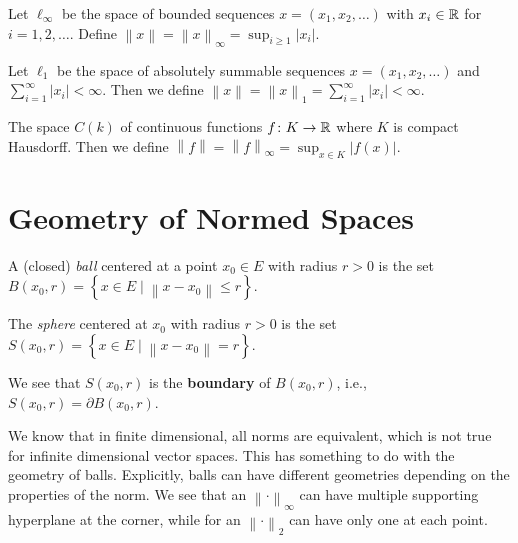 \begin{eg}[\(\ell_\infty\)]
	Let \(\ell _\infty \) be the space of bounded sequences \(x = (x_1, x_2, \ldots )\) with \(x_i\in \mathbb{\MakeUppercase{r}} \) for \(i = 1, 2, \ldots \). Define \(\left\lVert x\right\rVert = \left\lVert x\right\rVert _\infty = \sup _{i \geq 1}\left\vert x_i \right\vert \).
\end{eg}

\begin{eg}[\(\ell _1\)]
	Let \(\ell _1\) be the space of absolutely summable sequences \(x = (x_1, x_2, \ldots  )\) and \(\sum_{i=1}^{\infty} \left\vert x_i \right\vert < \infty\). Then we define \(\left\lVert x\right\rVert = \left\lVert x\right\rVert _1 = \sum_{i=1}^{\infty} \left\vert x_i \right\vert < \infty\).
\end{eg}

\begin{eg}[\(C(k)\)]
	The space \(C(k)\) of continuous functions \(f\colon K\to \mathbb{\MakeUppercase{r}} \) where \(K\) is compact Hausdorff. Then we define \(\left\lVert f\right\rVert = \left\lVert f\right\rVert _\infty = \sup _{x\in K}\left\vert f(x) \right\vert \).
\end{eg}

\section{Geometry of Normed Spaces}
\begin{definition}[Ball]
	A (closed) \emph{ball} centered at a point \(x_0\in E\) with radius \(r>0\) is the set \(B(x_0, r) = \left\{ x\in E\mid \left\lVert x - x_0\right\rVert \leq r \right\} \).
\end{definition}

\begin{definition}[Sphere]
	The \emph{sphere} centered at \(x_0\) with radius \(r>0\) is the set \(S(x_0, r) = \left\{ x\in E\mid \left\lVert x - x_0\right\rVert = r\right\} \).
\end{definition}

\begin{remark}
	We see that \(S(x_0, r)\) is the \textbf{boundary} of \(B(x_0, r)\), i.e., \(S(x_0, r) = \partial B(x_0, r)\).
\end{remark}

We know that in finite dimensional, all norms are equivalent, which is not true for infinite dimensional vector spaces. This has something to do with the geometry of balls. Explicitly, balls can have different geometries depending on the properties of the norm. We see that an \(\left\lVert \cdot\right\rVert _{\infty}\) can have multiple supporting hyperplane at the corner, while for an \(\left\lVert \cdot\right\rVert _2\) can have only one at each point.


